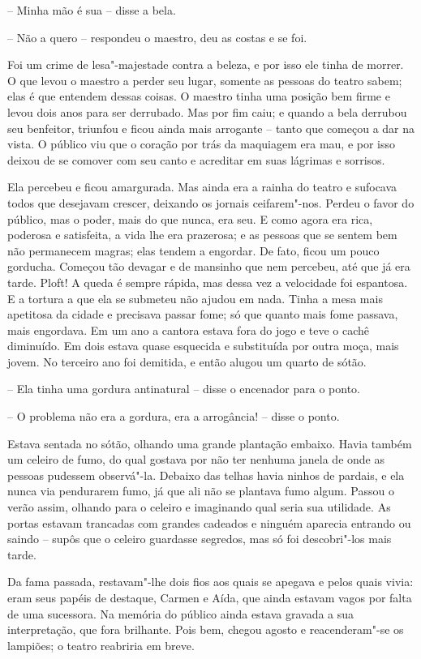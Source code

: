 -- Minha mão é sua -- disse a bela.

-- Não a quero -- respondeu o maestro, deu as costas e se foi.

Foi um crime de lesa"-majestade contra a beleza, e por isso ele tinha de
morrer. O que levou o maestro a perder seu lugar, somente as pessoas do
teatro sabem; elas é que entendem dessas coisas. O maestro tinha uma
posição bem firme e levou dois anos para ser derrubado. Mas por fim
caiu; e quando a bela derrubou seu benfeitor, triunfou e ficou ainda
mais arrogante -- tanto que começou a dar na vista. O público viu que o
coração por trás da maquiagem era mau, e por isso deixou de se comover
com seu canto e acreditar em suas lágrimas e sorrisos.

Ela percebeu e ficou amargurada. Mas ainda era a rainha do teatro e
sufocava todos que desejavam crescer, deixando os jornais
ceifarem"-nos. Perdeu o favor do público, mas o poder, mais do que
nunca, era seu. E como agora era rica, poderosa e satisfeita, a vida
lhe era prazerosa; e as pessoas que se sentem bem não permanecem
magras; elas tendem a engordar. De fato, ficou um pouco gorducha.
Começou tão devagar e de mansinho que nem percebeu, até que já era
tarde. Ploft! A queda é sempre rápida, mas dessa vez a velocidade foi
espantosa. E a tortura a que ela se submeteu não ajudou em nada. Tinha
a mesa mais apetitosa da cidade e precisava passar fome; só que quanto
mais fome passava, mais engordava. 
\pagebreak
Em um ano a cantora estava fora do jogo e teve o cachê diminuído. Em
dois estava quase esquecida e substituída por outra moça, mais jovem.
No terceiro ano foi demitida, e então alugou um quarto de sótão.

-- Ela tinha uma gordura antinatural -- disse o encenador para o ponto.

-- O problema não era a gordura, era a arrogância! -- disse o ponto.
\asterisc

Estava sentada no sótão, olhando uma grande plantação embaixo. Havia
também um celeiro de fumo, do qual gostava por não ter nenhuma janela
de onde as pessoas pudessem observá"-la. Debaixo das telhas havia
ninhos de pardais, e ela nunca via pendurarem fumo, já que ali não se
plantava fumo algum. Passou o verão assim, olhando para o celeiro e
imaginando qual seria sua utilidade. As portas estavam trancadas com
grandes cadeados e ninguém aparecia entrando ou saindo -- supôs que o
celeiro guardasse segredos, mas só foi descobri"-los mais tarde.

Da fama passada, restavam"-lhe dois fios aos quais se apegava e pelos
quais vivia: eram seus papéis de destaque, Carmen e Aída, que ainda
estavam vagos por falta de uma sucessora. Na memória do público ainda
estava gravada a sua interpretação, que fora brilhante. Pois bem,
chegou agosto e reacenderam"-se os lampiões; o teatro reabriria em
breve.

